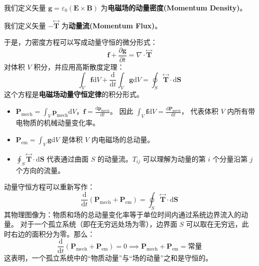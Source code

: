 \documentclass[fontset=none]{ctexart}
\begin{document}
\begin{definition}[电磁场动量密度]
我们定义矢量 $\bm{g} = \varepsilon_0(\bm{E} \times \bm{B})$ 为\textbf{电磁场的动量密度(Momentum Density)}。
\end{definition}

\begin{definition}[动量流]
    我们定义矢量 $- \overset{\leftrightarrow}{\bm{T}}$ 为\textbf{动量流(Momentum Flux)}。
\end{definition}

于是，力密度方程可以写成动量守恒的微分形式：
\begin{equation}
    \bm{f} + \frac{\partial \bm{g}}{\partial t} = \nabla \cdot \overset{\leftrightarrow}{\bm{T}}
\end{equation}
对体积 $V$ 积分，并应用高斯散度定理：
\begin{equation}
    \int_V \bm{f} \mathrm{d}V + \frac{\mathrm{d}}{\mathrm{d}t}\int_V \bm{g} \mathrm{d}V 
    = \oint_S \overset{\leftrightarrow}{\bm{T}} \cdot \mathrm{d}\bm{S}
\end{equation}
这个方程是\textbf{电磁场动量守恒定律}的积分形式。
\begin{itemize}
    \item $\bm{P}_{\text{mech}} = \int_V \bm{p}_{\text{mech}} \mathrm{d}V$，$\bm{f} 
    = \frac{\mathrm{d}\bm{p}_{\text{mech}}}{\mathrm{d}t}$。
    因此 $\int_V \bm{f} \mathrm{d}V = \frac{\mathrm{d}\bm{P}_{\text{mech}}}{\mathrm{d}t}$，
    代表体积 $V$ 内所有带电物质的机械动量变化率。
    \item $\bm{P}_{\text{em}} = \int_V \bm{g} \mathrm{d}V$ 是体积 $V$ 内电磁场的总动量。
    \item $\oint_S \overset{\leftrightarrow}{\bm{T}} \cdot \mathrm{d}\bm{S}$ 
    代表通过曲面 $S$ 的动量流。$T_{ij}$ 可以理解为动量的第 $i$ 个分量沿第 $j$ 个方向的流量。
\end{itemize}
动量守恒方程可以重新写作：
\begin{equation}
    \frac{\mathrm{d}}{\mathrm{d}t}(\bm{P}_{\text{mech}} + \bm{P}_{\text{em}}) 
    = \oint_S \overset{\leftrightarrow}{\bm{T}} \cdot \mathrm{d}\bm{S}
\end{equation}
其物理图像为：物质和场的总动量变化率等于单位时间内通过系统边界流入的动量。
对于一个孤立系统（即在无穷远处场为零），边界面 $S$ 可以取在无穷远，此时右边的面积分为零。那么：
\begin{equation}
    \frac{\mathrm{d}}{\mathrm{d}t}(\bm{P}_{\text{mech}} + \bm{P}_{\text{em}}) 
    = 0 \implies \bm{P}_{\text{mech}} + \bm{P}_{\text{em}} = \text{常量}
\end{equation}
这表明，一个孤立系统中的“物质动量”与“场的动量”之和是守恒的。
\end{document}
